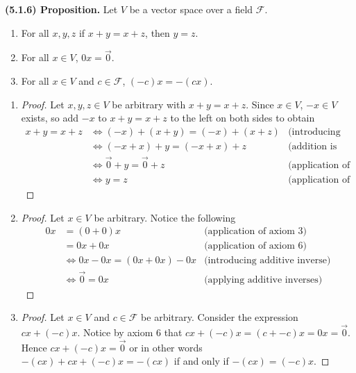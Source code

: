 \documentclass[12pt]{book}
\def\cF{{\mathcal{F}}}
\begin{document}
\vfill
\pagebreak

\noindent\textbf{(5.1.6) Proposition.} Let $V$ be a vector space over a field $\cF$.
\begin{enumerate}
\item For all $x,y,z$ if $x+y=x+z$, then $y=z$. 
\item For all $x\in V$, $0x=\vec{0}$.
\item For all $x\in V$ and $c\in\cF$, $(-c)x=-(cx)$.
\end{enumerate}

\begin{enumerate}
\item\begin{proof} Let $x,y,z\in V$ be arbitrary with $x+y=x+z$. Since $x\in V$, $-x\in V$ exists, so add $-x$ to $x+y=x+z$ to the left on both sides to obtain 
\begin{align*}
x+y=x+z & \Leftrightarrow (-x)+(x+y)=(-x)+(x+z) & \text{(introducing additive identity)}\\
 & \Leftrightarrow(-x+x)+y=(-x+x)+z & \text{(addition is associative)}\\
 & \Leftrightarrow \vec{0}+y=\vec{0}+z & \text{(application of additive inverses)}\\
 & \Leftrightarrow y=z & \text{(application of axiom 3)}
\end{align*}
\end{proof}
\item\begin{proof}
Let $x\in V$ be arbitrary. Notice the following
\begin{align*}
0x & = (0+0)x & \text{(application of axiom 3)}\\
 & = 0x+0x & \text{(application of axiom 6)}\\
 & \Leftrightarrow 0x-0x=(0x+0x)-0x & \text{(introducing additive inverse)}\\
 & \Leftrightarrow \vec{0} = 0x & \text{(applying additive inverses)}
\end{align*} 
\end{proof}
\item\begin{proof}
Let $x\in V$ and $c\in\cF$ be arbitrary. Consider the expression $cx+(-c)x$. Notice by axiom 6 that $cx+(-c)x=(c+-c)x=0x=\vec{0}$. Hence $cx+(-c)x=\vec{0}$ or in other words $-(cx)+cx+(-c)x=-(cx)$ if and only if $-(cx)=(-c)x$.
\end{proof}
\end{enumerate}

\end{document}
